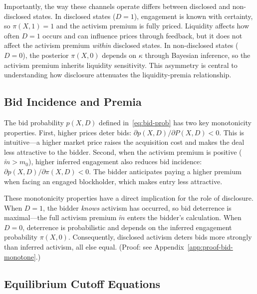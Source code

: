 \documentclass[11pt]{article}
\newcommand{\1}{\mathbf{1}}
\begin{document}
Importantly, the way these channels operate differs between disclosed and non-disclosed states. In disclosed states ($D=1$), engagement is known with certainty, so $\pi(X,1)=1$ and the activism premium is fully priced. Liquidity affects how often $D=1$ occurs and can influence prices through feedback, but it does not affect the activism premium \emph{within} disclosed states. In non-disclosed states ($D=0$), the posterior $\pi(X,0)$ depends on $\kappa$ through Bayesian inference, so the activism premium inherits liquidity sensitivity. This asymmetry is central to understanding how disclosure attenuates the liquidity-premia relationship.

\subsection{Bid Incidence and Premia}

The bid probability $p(X,D)$ defined in~\eqref{eq:bid-prob} has two key monotonicity properties. First, higher prices deter bids: $\partial p(X,D)/\partial P(X,D)<0$. This is intuitive---a higher market price raises the acquisition cost and makes the deal less attractive to the bidder. Second, when the activism premium is positive ($\tilde{m}>m_0$), higher inferred engagement also reduces bid incidence: $\partial p(X,D)/\partial\pi(X,D)<0$. The bidder anticipates paying a higher premium when facing an engaged blockholder, which makes entry less attractive.

These monotonicity properties have a direct implication for the role of disclosure. When $D=1$, the bidder \emph{knows} activism has occurred, so bid deterrence is maximal---the full activism premium $\tilde{m}$ enters the bidder's calculation. When $D=0$, deterrence is probabilistic and depends on the inferred engagement probability $\pi(X,0)$. Consequently, disclosed activism deters bids more strongly than inferred activism, all else equal. (Proof: see Appendix~\ref{app:proof-bid-monotone}.)

\subsection{Equilibrium Cutoff Equations}
\end{document}

